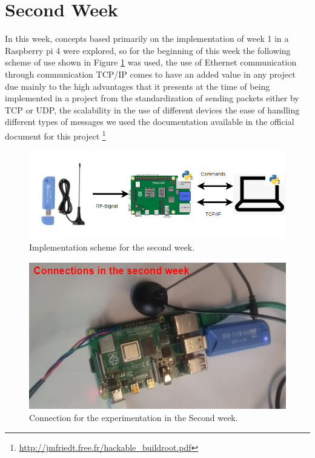 \documentclass[12pt, twoside]{report}
\begin{document}

\newpage
\section{Second Week}
In this week, concepts based primarily on the implementation of week 1 in a Raspberry pi 4 were explored, so for the beginning of this week the following scheme of use shown in Figure \ref{fig:scheme2} was used, the use of Ethernet communication through communication TCP/IP comes to have an added value in any project due mainly to the high advantages that it presents at the time of being implemented in a project from the standardization of sending packets either by TCP or UDP, the scalability in the use of different devices the ease of handling different types of messages we used the documentation available in the official document for this project \footnote{\url{http://jmfriedt.free.fr/hackable_buildroot.pdf}}\\
\begin{figure}[!h]
\centering
  \includegraphics[width=\linewidth]{images/scheme_part2.png}
  \caption{Implementation scheme for the second week.}
  \label{fig:scheme2}
\end{figure}
\begin{figure}[!h]
\centering
  \includegraphics[width=\linewidth]{images/Conn_second.png}
  \caption{Connection for the experimentation in the Second week.}
  \label{fig:week2}
\end{figure}
\end{document}
